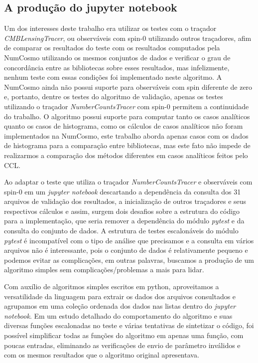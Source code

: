 \subsection*{A produção do jupyter notebook}
Um dos interesses deste trabalho era utilizar os testes com o traçador \textit{CMBLensingTracer}, ou observáveis com spin-0 utilizando outros traçadores, afim de comparar os resultados do teste com os resultados computados pela NumCosmo utilizando os mesmos conjuntos de dados e verificar o grau de concordância entre as bibliotecas sobre esses resultados, mas infelizmente, nenhum teste com essas condições foi implementado neste algoritmo. A NumCosmo ainda não possui suporte para observáveis com spin diferente de zero e, portanto, dentre os testes do algoritmo de validação, apenas os testes utilizando o traçador  \textit{NumberCountsTracer} com spin-0 permitem a continuidade do trabalho. O algoritmo possui suporte para computar tanto os casos analíticos quanto os casos de histograma, como os cálculos de casos analíticos não foram implementados na NumCosmo, este trabalho aborda apenas casos com  os dados de histograma para a comparação entre bibliotecas, mas este fato não impede de realizarmos a comparação dos métodos diferentes em casos analíticos feitos pelo CCL.

Ao adaptar o teste que utiliza o traçador \textit{NumberCountsTracer} e observáveis com spin-0 em um \textit{jupyter notebook} descartando a dependência da consulta dos 31 arquivos de validação dos resultados, a inicialização de outros traçadores e seus respectivos cálculos e assim, surgem dois desafios sobre a estrutura do código para a implementação, que seria remover a dependência do módulo \textit{pytest} e da consulta do conjunto de dados. A estrutura de testes escalonáveis do módulo \textit{pytest} é incompatível com o tipo de análise que precisamos e a consulta em vários arquivos não é interessante, pois o conjunto de dados é relativamente pequeno e podemos evitar as complicações, em outras palavras, buscamos a produção de um algoritmo simples sem complicações/problemas a mais para lidar.

Com auxílio de algoritmos simples escritos em python, aproveitamos a versatilidade da linguagem para extrair os dados dos arquivos consultados e agrupamos em uma coleção ordenada dos dados nas listas dentro do \textit{jupyter notebook}. Em um estudo detalhado do comportamento do algoritmo e suas diversas funções escalonadas no teste e várias tentativas de sintetizar o código, foi possível simplificar todas as funções do algoritmo em apenas uma função, com poucas entradas, eliminando as verificações de envio de parâmetro inválidos e com os mesmos resultados que o algoritmo original apresentava.

